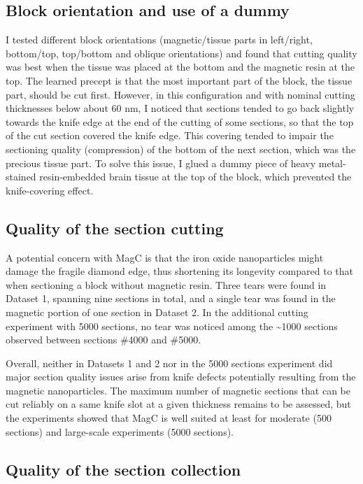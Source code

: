 \documentclass{article}
\begin{document}
\subsection*{Block orientation and use of a dummy}

I tested different block orientations (magnetic/tissue parts in left/right, bottom/top, top/bottom and oblique orientations) and found that cutting quality was best when the tissue was placed at the bottom and the magnetic resin at the top. The learned precept is that the most important part of the block, the tissue part, should be cut first. However, in this configuration and with nominal cutting thicknesses below about 60 nm, I noticed that sections tended to go back slightly towards the knife edge at the end of the cutting of some sections, so that the top of the cut section covered the knife edge. This covering tended to impair the sectioning quality (compression) of the bottom of the next section, which was the precious tissue part. To solve this issue, I glued a dummy piece of heavy metal-stained resin-embedded brain tissue at the top of the block, which prevented the knife-covering effect.

\subsection*{Quality of the section cutting}

A potential concern with MagC is that the iron oxide nanoparticles might damage the fragile diamond edge, thus shortening its longevity compared to that when sectioning a block without magnetic resin. Three tears were found in Dataset 1, spanning nine sections in total, and a single tear was found in the magnetic portion of one section in Dataset 2. In the additional cutting experiment with 5000 sections, no tear was noticed among the \textasciitilde1000 sections observed between sections \#4000 and \#5000.

Overall, neither in Datasets 1 and 2 nor in the 5000 sections experiment did major section quality issues arise from knife defects potentially resulting from the magnetic nanoparticles. The maximum number of magnetic sections that can be cut reliably on a same knife slot at a given thickness remains to be assessed, but the experiments showed that MagC is well suited at least for moderate (500 sections) and large-scale experiments (5000 sections).

\subsection*{Quality of the section collection}
\end{document}
